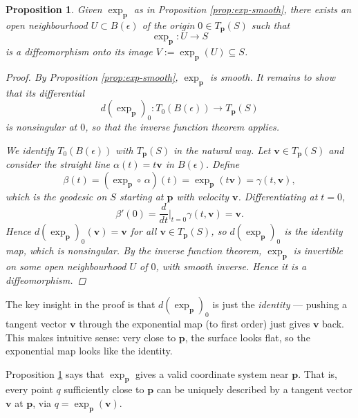 \documentclass[10pt, a4paper]{article}
\theoremstyle{plain}
\newtheorem{proposition}[theorem]{Proposition}
\theoremstyle{definition}
\theoremstyle{remark}
\newenvironment{sidenote}{%
  \par\vspace{0.5em}%
  \noindent\color{defcolor}%
}{%
  \par\vspace{0.5em}%
  \color{black}%
}
\begin{document}
\begin{proposition}\label{prop:exp-diffeo}
    Given $\exp_\mathbf{p}$ as in Proposition \ref{prop:exp-smooth}, there exists an 
    open neighbourhood $U \subset B(\epsilon)$ of the origin $0 \in T_\mathbf{p}(S)$ 
    such that
    \[
        \exp_\mathbf{p}: U \to S
    \]
    is a diffeomorphism onto its image $V := \exp_\mathbf{p}(U) \subseteq S$.

    \begin{proof}
    By Proposition \ref{prop:exp-smooth}, $\exp_\mathbf{p}$ is smooth. It remains to 
    show that its differential
    \[
        d(\exp_\mathbf{p})_0: T_0(B(\epsilon)) \to T_\mathbf{p}(S)
    \]
    is nonsingular at $0$, so that the inverse function theorem applies.

    We identify $T_0(B(\epsilon))$ with $T_\mathbf{p}(S)$ in the natural way. Let 
    $\mathbf{v} \in T_\mathbf{p}(S)$ and consider the straight line 
    $\alpha(t) = t\mathbf{v}$ in $B(\epsilon)$. Define
    \[
        \beta(t) = (\exp_\mathbf{p} \circ\, \alpha)(t) = \exp_\mathbf{p}(t\mathbf{v}) 
        = \gamma(t, \mathbf{v}),
    \]
    which is the geodesic on $S$ starting at $\mathbf{p}$ with velocity $\mathbf{v}$. 
    Differentiating at $t = 0$,
    \[
        \beta'(0) = \frac{d}{dt}\Big|_{t=0} \gamma(t, \mathbf{v}) = \mathbf{v}.
    \]
    Hence $d(\exp_\mathbf{p})_0(\mathbf{v}) = \mathbf{v}$ for all $\mathbf{v} \in 
    T_\mathbf{p}(S)$, so $d(\exp_\mathbf{p})_0$ is the identity map, which is 
    nonsingular. By the inverse function theorem, $\exp_\mathbf{p}$ is invertible on 
    some open neighbourhood $U$ of $0$, with smooth inverse. Hence it is a 
    diffeomorphism.
    \end{proof}
\end{proposition}

\begin{sidenote}
    The key insight in the proof is that $d(\exp_\mathbf{p})_0$ is just the 
    \textit{identity} --- pushing a tangent vector $\mathbf{v}$ through the 
    exponential map (to first order) just gives $\mathbf{v}$ back. This makes 
    intuitive sense: very close to $\mathbf{p}$, the surface looks flat, so the 
    exponential map looks like the identity.

    Proposition \ref{prop:exp-diffeo} says that $\exp_\mathbf{p}$ gives a valid 
    coordinate system near $\mathbf{p}$. That is, every point $q$ sufficiently close 
    to $\mathbf{p}$ can be uniquely described by a tangent vector $\mathbf{v}$ at 
    $\mathbf{p}$, via $q = \exp_\mathbf{p}(\mathbf{v})$.
\end{sidenote}
\end{document}
